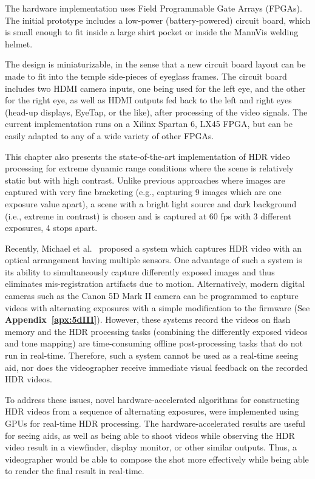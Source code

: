 The hardware implementation uses Field Programmable Gate Arrays (FPGAs).  The initial prototype 
includes a low-power (battery-powered) circuit board, which is small enough to fit inside a large
shirt pocket or inside the MannVis welding helmet.

The design is miniaturizable, in the sense that a new circuit board layout can be made to fit into the 
temple side-pieces of eyeglass frames.  The circuit board includes two HDMI camera inputs, one 
being used for the left eye, and the other for the right eye, as well as HDMI outputs fed back to the 
left and right eyes
(head-up displays, EyeTap, or the like), after processing of the video signals.  The current 
implementation runs on a Xilinx Spartan 6, LX45 FPGA, but can be easily adapted to any of a wide 
variety of other FPGAs.

This chapter also presents the state-of-the-art implementation of HDR video processing for extreme 
dynamic range conditions where the scene is relatively static but with high contrast. Unlike previous 
approaches where images are captured with very fine bracketing (e.g., capturing 9 images which are 
one exposure value apart), a scene with a bright light source and dark background (i.e., extreme in 
contrast) is chosen and is captured at 60 fps with 3 different exposures, 4 stops apart. 

Recently, Michael et al.~\cite{HDRVideoCamera11} proposed a system which captures HDR video 
with an optical arrangement having multiple sensors. One advantage of such a system is its ability to 
simultaneously capture differently exposed images and thus eliminates mis-registration artifacts due 
to motion. Alternatively, modern digital cameras such as the Canon 5D Mark II camera can be 
programmed to capture videos with alternating exposures with a simple modification to the firmware 
(See \textbf{Appendix~\ref{apx:5dIII}}). However, these systems record the videos on flash memory 
and the HDR processing tasks (combining the differently exposed videos and tone mapping) are 
time-consuming offline post-processing tasks that do not run in real-time.  Therefore, such a system 
cannot be used as a real-time seeing aid, nor does the videographer receive immediate visual 
feedback on the recorded HDR videos. 

To address these issues, novel hardware-accelerated algorithms for constructing HDR videos from a 
sequence of alternating exposures, were implemented using GPUs for real-time HDR processing. 
The hardware-accelerated results are useful for seeing aids, as well as being able to shoot videos 
while observing the HDR video result in a viewfinder, display monitor, or other similar outputs. Thus, 
a videographer would be able to compose the shot more effectively while being able to render the 
final result in real-time.

